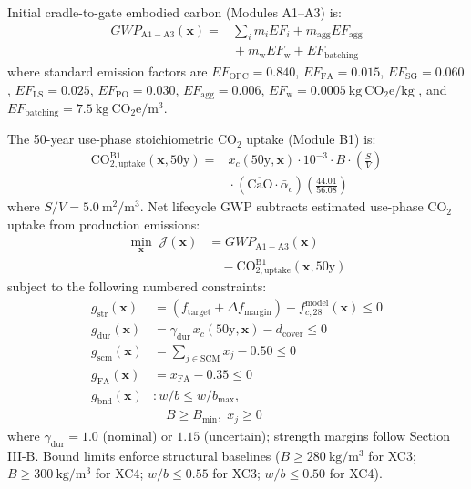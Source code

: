 \documentclass[journal]{IEEEtran}
\begin{document}
Initial cradle-to-gate embodied carbon (Modules A1--A3) is:
\begin{align}
GWP_{\mathrm{A1-A3}}(\mathbf{x}) ={}& \sum_i m_i EF_i + m_{\mathrm{agg}}EF_{\mathrm{agg}} \nonumber \\
&{}+ m_{\mathrm{w}}EF_{\mathrm{w}} + EF_{\mathrm{batching}}
\label{eq:gwp_a1a3}
\end{align}
where standard emission factors are $EF_{\mathrm{OPC}}=0.840$, $EF_{\mathrm{FA}}=0.015$, $EF_{\mathrm{SG}}=0.060$, $EF_{\mathrm{LS}}=0.025$, $EF_{\mathrm{PO}}=0.030$, $EF_{\mathrm{agg}}=0.006$, $EF_{\mathrm{w}}=0.0005\ \mathrm{kg\ CO_2e/kg}$ \cite{ice3}, and $EF_{\mathrm{batching}} = 7.5\ \mathrm{kg\ CO_2e/m^3}$.

The 50-year use-phase stoichiometric $\mathrm{CO}_2$ uptake (Module B1) is:
\begin{align}
\mathrm{CO}_{2,\mathrm{uptake}}^{\mathrm{B1}}(\mathbf{x}, 50\mathrm{y}) ={}& x_c(50\mathrm{y}, \mathbf{x}) \cdot 10^{-3} \cdot B \cdot \left(\frac{S}{V}\right) \nonumber \\
&{}\cdot (\overline{\mathrm{CaO}} \cdot \bar{\alpha}_c) \left(\frac{44.01}{56.08}\right)
\label{eq:uptake_formal}
\end{align}
where $S/V = 5.0\ \mathrm{m^2/m^3}$. Net lifecycle GWP subtracts estimated use-phase $\mathrm{CO}_2$ uptake from production emissions:
\begin{equation}
\begin{aligned}
\min_{\mathbf{x}} \; \mathcal{J}(\mathbf{x})
&= GWP_{\mathrm{A1-A3}}(\mathbf{x}) \\
&\quad - \mathrm{CO}_{2,\mathrm{uptake}}^{\mathrm{B1}}(\mathbf{x}, 50\mathrm{y})
\end{aligned}
\label{eq:nlp_opt}
\end{equation}
subject to the following numbered constraints:
\begin{align}
g_{\mathrm{str}}(\mathbf{x}) &= (f_{\mathrm{target}} + \Delta f_{\mathrm{margin}}) - f_{c,28}^{\mathrm{model}}(\mathbf{x}) \le 0 \label{eq:cstr_str} \\
g_{\mathrm{dur}}(\mathbf{x}) &= \gamma_{\mathrm{dur}} \, x_c(50\mathrm{y}, \mathbf{x}) - d_{\mathrm{cover}} \le 0 \label{eq:cstr_dur} \\
g_{\mathrm{scm}}(\mathbf{x}) &= \sum_{j \in \mathrm{SCM}} x_j - 0.50 \le 0 \label{eq:cstr_scm} \\
g_{\mathrm{FA}}(\mathbf{x}) &= x_{\mathrm{FA}} - 0.35 \le 0 \label{eq:cstr_fa} \\
g_{\mathrm{bnd}}(\mathbf{x}) &: w/b \le w/b_{\max}, \nonumber \\
&\quad B \ge B_{\min}, \; x_j \ge 0 \label{eq:cstr_bounds}
\end{align}
where $\gamma_{\mathrm{dur}}=1.0$ (nominal) or $1.15$ (uncertain); strength margins follow Section III-B. Bound limits enforce structural baselines ($B \ge 280\ \mathrm{kg/m^3}$ for XC3; $B \ge 300\ \mathrm{kg/m^3}$ for XC4; $w/b \le 0.55$ for XC3; $w/b \le 0.50$ for XC4).
\end{document}
